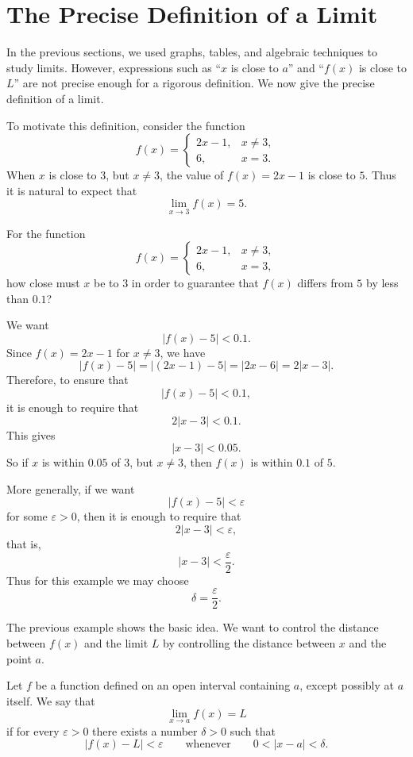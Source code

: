 \section{The Precise Definition of a Limit}

In the previous sections, we used graphs, tables, and algebraic techniques to study limits. However, expressions such as ``\(x\) is close to \(a\)'' and ``\(f(x)\) is close to \(L\)'' are not precise enough for a rigorous definition. We now give the precise definition of a limit.

To motivate this definition, consider the function
\[
f(x)=
\begin{cases}
2x-1, & x\ne 3,\\[4pt]
6, & x=3.
\end{cases}
\]
When \(x\) is close to \(3\), but \(x\ne 3\), the value of \(f(x)=2x-1\) is close to \(5\). Thus it is natural to expect that
\[
\lim_{x\to 3}f(x)=5.
\]

\begin{example}
For the function
\[
f(x)=
\begin{cases}
2x-1, & x\ne 3,\\[4pt]
6, & x=3,
\end{cases}
\]
how close must \(x\) be to \(3\) in order to guarantee that \(f(x)\) differs from \(5\) by less than \(0.1\)?
\end{example}

\begin{solution}
We want
\[
|f(x)-5|<0.1.
\]
Since \(f(x)=2x-1\) for \(x\ne 3\), we have
\[
|f(x)-5|
=
|(2x-1)-5|
=
|2x-6|
=
2|x-3|.
\]
Therefore, to ensure that
\[
|f(x)-5|<0.1,
\]
it is enough to require that
\[
2|x-3|<0.1.
\]
This gives
\[
|x-3|<0.05.
\]
So if \(x\) is within \(0.05\) of \(3\), but \(x\ne 3\), then \(f(x)\) is within \(0.1\) of \(5\).

More generally, if we want
\[
|f(x)-5|<\varepsilon
\]
for some \(\varepsilon>0\), then it is enough to require that
\[
2|x-3|<\varepsilon,
\]
that is,
\[
|x-3|<\frac{\varepsilon}{2}.
\]
Thus for this example we may choose
\[
\delta=\frac{\varepsilon}{2}.
\]
\end{solution}

The previous example shows the basic idea. We want to control the distance between \(f(x)\) and the limit \(L\) by controlling the distance between \(x\) and the point \(a\).

\begin{definition}
Let \(f\) be a function defined on an open interval containing \(a\), except possibly at \(a\) itself. We say that
\[
\lim_{x\to a}f(x)=L
\]
if for every \(\varepsilon>0\) there exists a number \(\delta>0\) such that
\[
|f(x)-L|<\varepsilon
\qquad \text{whenever} \qquad
0<|x-a|<\delta.
\]
\end{definition}

